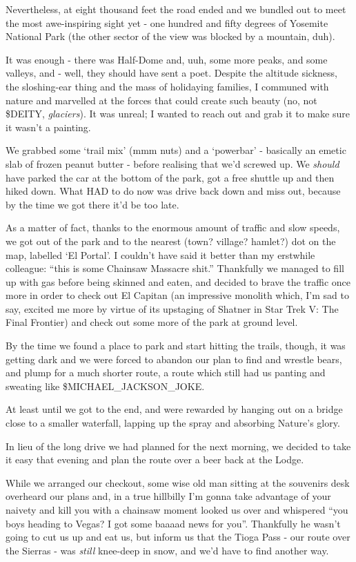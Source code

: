 \documentclass[a5paper,titlepage,draft]{book}
\begin{document}
Nevertheless, at eight thousand feet the road ended and we bundled out to meet the most awe-inspiring sight yet - one hundred and fifty degrees of Yosemite National Park (the other sector of the view was blocked by a mountain, duh).

It was enough - there was Half-Dome and, uuh, some more peaks, and some valleys, and - well, they should have sent a poet.  Despite the altitude sickness, the sloshing-ear thing and the mass of holidaying families, I communed with nature and marvelled at the forces that could create such beauty (no, not \$DEITY, \emph{glaciers}).  It was unreal; I wanted to reach out and grab it to make sure it wasn't a painting.

We grabbed some `trail mix' (mmm nuts) and a `powerbar' - basically an emetic slab of frozen peanut butter - before realising that we'd screwed up.  We \emph{should} have parked the car at the bottom of the park, got a free shuttle up and then hiked down.  What HAD to do now was drive back down and miss out, because by the time we got there it'd be too late.

As a matter of fact, thanks to the enormous amount of traffic and slow speeds, we got out of the park and to the nearest (town? village? hamlet?) dot on the map, labelled `El Portal'.  I couldn't have said it better than my erstwhile colleague: ``this is some Chainsaw Massacre shit.''  Thankfully we managed to fill up with gas before being skinned and eaten, and decided to brave the traffic once more in order to check out El Capitan (an impressive monolith which, I'm sad to say, excited me more by virtue of its upstaging of Shatner in Star Trek V: The Final Frontier) and check out some more of the park at ground level.

By the time we found a place to park and start hitting the trails, though, it was getting dark and we were forced to abandon our plan to find and wrestle bears, and plump for a much shorter route, a route which still had us panting and sweating like \$MICHAEL\_JACKSON\_JOKE.

At least until we got to the end, and were rewarded by hanging out on a bridge close to a smaller waterfall, lapping up the spray and absorbing Nature's glory.

In lieu of the long drive we had planned for the next morning, we decided to take it easy that evening and plan the route over a beer back at the Lodge.

While we arranged our checkout, some wise old man sitting at the souvenirs desk overheard our plans and, in a true hillbilly I'm gonna take advantage of your naivety and kill you with a chainsaw moment looked us over and whispered ``you boys heading to Vegas? I got some baaaad news for you''.  Thankfully he wasn't going to cut us up and eat us, but inform us that the Tioga Pass - our route over the Sierras - was \emph{still} knee-deep in snow, and we'd have to find another way.
\end{document}
